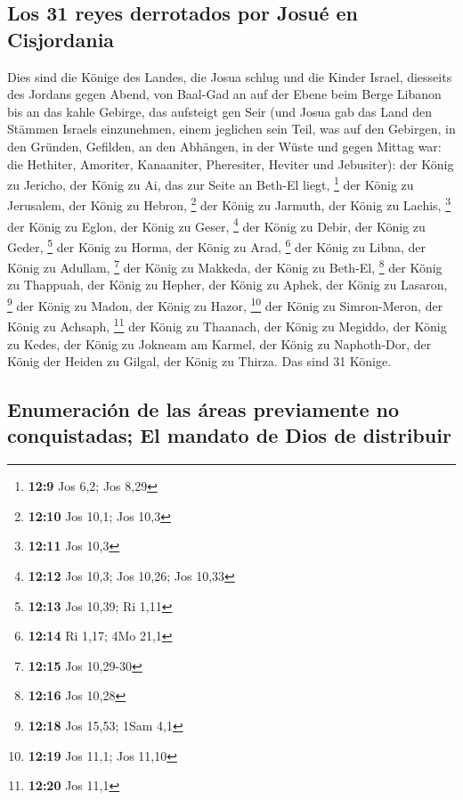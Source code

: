 \hypertarget{los-31-reyes-derrotados-por-josuuxe9-en-cisjordania}{%
\subsection{Los 31 reyes derrotados por Josué en
Cisjordania}\label{los-31-reyes-derrotados-por-josuuxe9-en-cisjordania}}

 Dies sind die Könige des Landes, die Josua schlug und die
Kinder Israel, diesseits des Jordans gegen Abend, von Baal-Gad an auf
der Ebene beim Berge Libanon bis an das kahle Gebirge, das aufsteigt gen
Seir (und Josua gab das Land den Stämmen Israels einzunehmen, einem
jeglichen sein Teil,  was auf den Gebirgen, in den
Gründen, Gefilden, an den Abhängen, in der Wüste und gegen Mittag war:
die Hethiter, Amoriter, Kanaaniter, Pheresiter, Heviter und Jebusiter):
 der König zu Jericho, der König zu Ai, das zur Seite an
Beth-El liegt, \footnote{\textbf{12:9} Jos 6,2; Jos 8,29}
 der König zu Jerusalem, der König zu Hebron, \footnote{\textbf{12:10}
  Jos 10,1; Jos 10,3}  der König zu Jarmuth, der König zu
Lachis, \footnote{\textbf{12:11} Jos 10,3}  der König zu
Eglon, der König zu Geser, \footnote{\textbf{12:12} Jos 10,3; Jos 10,26;
  Jos 10,33}  der König zu Debir, der König zu Geder,
\footnote{\textbf{12:13} Jos 10,39; Ri 1,11}  der König
zu Horma, der König zu Arad, \footnote{\textbf{12:14} Ri 1,17; 4Mo 21,1}
 der König zu Libna, der König zu Adullam, \footnote{\textbf{12:15}
  Jos 10,29-30}  der König zu Makkeda, der König zu
Beth-El, \footnote{\textbf{12:16} Jos 10,28}  der König
zu Thappuah, der König zu Hepher,  der König zu Aphek,
der König zu Lasaron, \footnote{\textbf{12:18} Jos 15,53; 1Sam 4,1}
 der König zu Madon, der König zu Hazor, \footnote{\textbf{12:19}
  Jos 11,1; Jos 11,10}  der König zu Simron-Meron, der
König zu Achsaph, \footnote{\textbf{12:20} Jos 11,1}  der
König zu Thaanach, der König zu Megiddo,  der König zu
Kedes, der König zu Jokneam am Karmel,  der König zu
Naphoth-Dor, der König der Heiden zu Gilgal,  der König
zu Thirza. Das sind 31 Könige.

\hypertarget{enumeraciuxf3n-de-las-uxe1reas-previamente-no-conquistadas-el-mandato-de-dios-de-distribuir}{%
\subsection{Enumeración de las áreas previamente no conquistadas; El
mandato de Dios de
distribuir}\label{enumeraciuxf3n-de-las-uxe1reas-previamente-no-conquistadas-el-mandato-de-dios-de-distribuir}}

